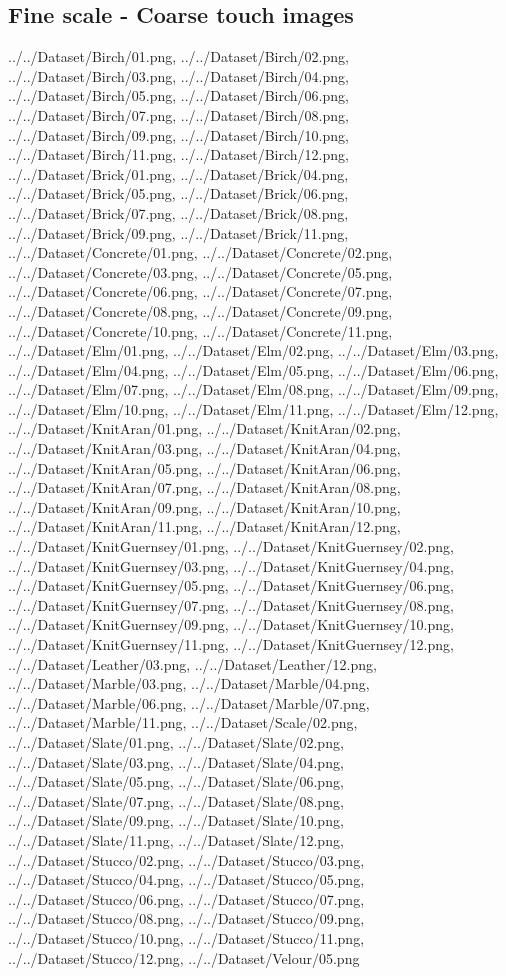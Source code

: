 \newpage
\subsection{Fine scale - Coarse touch images}
{../../Dataset/Birch/01.png,
../../Dataset/Birch/02.png,
../../Dataset/Birch/03.png,
../../Dataset/Birch/04.png,
../../Dataset/Birch/05.png,
../../Dataset/Birch/06.png,
../../Dataset/Birch/07.png,
../../Dataset/Birch/08.png,
../../Dataset/Birch/09.png,
../../Dataset/Birch/10.png,
../../Dataset/Birch/11.png,
../../Dataset/Birch/12.png,
../../Dataset/Brick/01.png,
../../Dataset/Brick/04.png,
../../Dataset/Brick/05.png,
../../Dataset/Brick/06.png,
../../Dataset/Brick/07.png,
../../Dataset/Brick/08.png,
../../Dataset/Brick/09.png,
../../Dataset/Brick/11.png,
../../Dataset/Concrete/01.png,
../../Dataset/Concrete/02.png,
../../Dataset/Concrete/03.png,
../../Dataset/Concrete/05.png,
../../Dataset/Concrete/06.png,
../../Dataset/Concrete/07.png,
../../Dataset/Concrete/08.png,
../../Dataset/Concrete/09.png,
../../Dataset/Concrete/10.png,
../../Dataset/Concrete/11.png,
../../Dataset/Elm/01.png,
../../Dataset/Elm/02.png,
../../Dataset/Elm/03.png,
../../Dataset/Elm/04.png,
../../Dataset/Elm/05.png,
../../Dataset/Elm/06.png,
../../Dataset/Elm/07.png,
../../Dataset/Elm/08.png,
../../Dataset/Elm/09.png,
../../Dataset/Elm/10.png,
../../Dataset/Elm/11.png,
../../Dataset/Elm/12.png,
../../Dataset/KnitAran/01.png,
../../Dataset/KnitAran/02.png,
../../Dataset/KnitAran/03.png,
../../Dataset/KnitAran/04.png,
../../Dataset/KnitAran/05.png,
../../Dataset/KnitAran/06.png,
../../Dataset/KnitAran/07.png,
../../Dataset/KnitAran/08.png,
../../Dataset/KnitAran/09.png,
../../Dataset/KnitAran/10.png,
../../Dataset/KnitAran/11.png,
../../Dataset/KnitAran/12.png,
../../Dataset/KnitGuernsey/01.png,
../../Dataset/KnitGuernsey/02.png,
../../Dataset/KnitGuernsey/03.png,
../../Dataset/KnitGuernsey/04.png,
../../Dataset/KnitGuernsey/05.png,
../../Dataset/KnitGuernsey/06.png,
../../Dataset/KnitGuernsey/07.png,
../../Dataset/KnitGuernsey/08.png,
../../Dataset/KnitGuernsey/09.png,
../../Dataset/KnitGuernsey/10.png,
../../Dataset/KnitGuernsey/11.png,
../../Dataset/KnitGuernsey/12.png,
../../Dataset/Leather/03.png,
../../Dataset/Leather/12.png,
../../Dataset/Marble/03.png,
../../Dataset/Marble/04.png,
../../Dataset/Marble/06.png,
../../Dataset/Marble/07.png,
../../Dataset/Marble/11.png,
../../Dataset/Scale/02.png,
../../Dataset/Slate/01.png,
../../Dataset/Slate/02.png,
../../Dataset/Slate/03.png,
../../Dataset/Slate/04.png,
../../Dataset/Slate/05.png,
../../Dataset/Slate/06.png,
../../Dataset/Slate/07.png,
../../Dataset/Slate/08.png,
../../Dataset/Slate/09.png,
../../Dataset/Slate/10.png,
../../Dataset/Slate/11.png,
../../Dataset/Slate/12.png,
../../Dataset/Stucco/02.png,
../../Dataset/Stucco/03.png,
../../Dataset/Stucco/04.png,
../../Dataset/Stucco/05.png,
../../Dataset/Stucco/06.png,
../../Dataset/Stucco/07.png,
../../Dataset/Stucco/08.png,
../../Dataset/Stucco/09.png,
../../Dataset/Stucco/10.png,
../../Dataset/Stucco/11.png,
../../Dataset/Stucco/12.png,
../../Dataset/Velour/05.png}

